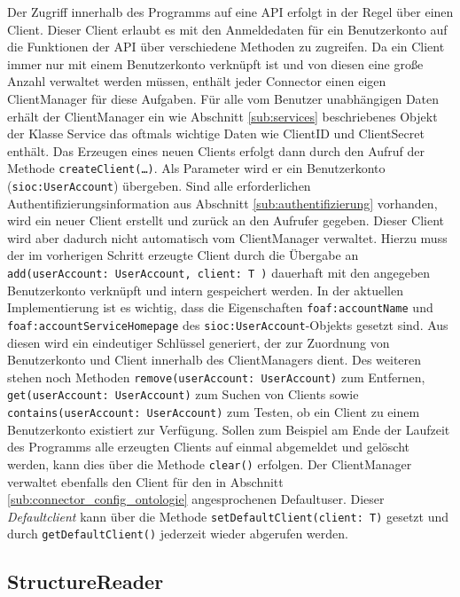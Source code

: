 Der Zugriff innerhalb des Programms auf eine API erfolgt in der Regel über einen Client. Dieser Client erlaubt es mit den Anmeldedaten für ein Benutzerkonto auf die Funktionen der API über verschiedene Methoden zu zugreifen. Da ein Client immer nur mit einem Benutzerkonto verknüpft ist und von diesen eine große Anzahl verwaltet werden müssen, enthält jeder Connector einen eigen ClientManager für diese Aufgaben. Für alle vom Benutzer unabhängigen Daten erhält der ClientManager ein wie Abschnitt \ref{sub:services} beschriebenes Objekt der Klasse Service das oftmals wichtige Daten wie ClientID und ClientSecret enthält. Das Erzeugen eines neuen Clients erfolgt dann durch den Aufruf der Methode \texttt{createClient(\dots)}. Als Parameter wird er ein Benutzerkonto (\texttt{sioc:UserAccount}) übergeben. Sind alle erforderlichen Authentifizierungsinformation aus Abschnitt \ref{sub:authentifizierung} vorhanden, wird ein neuer Client erstellt und zurück an den Aufrufer gegeben. Dieser Client wird aber dadurch nicht automatisch vom ClientManager verwaltet. Hierzu muss der im vorherigen Schritt erzeugte Client durch die Übergabe an \texttt{add(userAccount: UserAccount, client: T )} dauerhaft mit den angegeben Benutzerkonto verknüpft und intern gespeichert werden. In der aktuellen Implementierung ist es wichtig, dass die Eigenschaften \texttt{foaf:accountName} und \texttt{foaf:accountServiceHomepage} des \texttt{sioc:UserAccount}-Objekts gesetzt sind. Aus diesen wird ein eindeutiger Schlüssel generiert, der zur Zuordnung von Benutzerkonto und Client innerhalb des ClientManagers dient. Des weiteren stehen noch Methoden \texttt{remove(userAccount: UserAccount)} zum Entfernen, \texttt{get(userAccount: UserAccount)} zum Suchen von Clients sowie \texttt{contains(userAccount: UserAccount)} zum Testen, ob ein Client zu einem Benutzerkonto existiert zur Verfügung. Sollen zum Beispiel am Ende der Laufzeit des Programms alle erzeugten Clients auf einmal abgemeldet und gelöscht werden, kann dies über die Methode \texttt{clear()} erfolgen. Der ClientManager verwaltet ebenfalls den Client für den in Abschnitt \ref{sub:connector_config_ontologie} angesprochenen Defaultuser. Dieser \emph{Defaultclient} kann über die Methode  \texttt{setDefaultClient(client: T)} gesetzt und durch \texttt{getDefaultClient()} jederzeit wieder abgerufen werden. 

\pagebreak

\subsection{StructureReader} %
\label{sub:structurereader}

